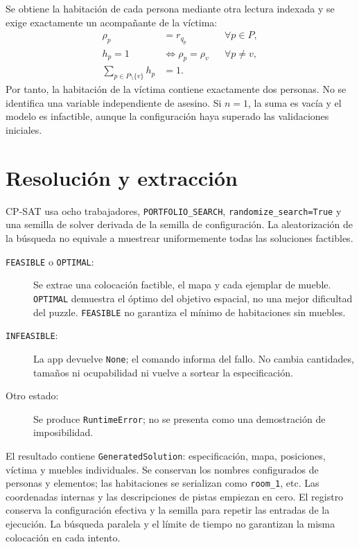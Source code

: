 \documentclass[11pt,a4paper]{article}
\begin{document}
Se obtiene la habitaci\'on de cada persona mediante otra lectura
indexada y se exige exactamente un acompa\~nante de la v\'ictima:
\begin{align}
 \rho_p&=r_{q_p} &&\forall p\in P,\\
 h_p=1&\Longleftrightarrow \rho_p=\rho_v &&\forall p\neq v,\\
 \sum_{p\in P\setminus\{v\}}h_p&=1.
\end{align}
Por tanto, la habitaci\'on de la v\'ictima contiene exactamente dos
personas. No se identifica una variable independiente de asesino.
Si $n=1$, la suma es vac\'ia y el modelo es infactible, aunque la
configuraci\'on haya superado las validaciones iniciales.

\section{Resoluci\'on y extracci\'on}

CP-SAT usa ocho trabajadores, \texttt{PORTFOLIO\_SEARCH},
\texttt{randomize\_search=True} y una semilla de solver derivada de la
semilla de configuraci\'on. La aleatorizaci\'on de la b\'usqueda no
equivale a muestrear uniformemente todas las soluciones factibles.

\begin{description}
  \item[\texttt{FEASIBLE} o \texttt{OPTIMAL}:] Se extrae una colocaci\'on
        factible, el mapa y cada ejemplar de mueble.
        \texttt{OPTIMAL} demuestra el \'optimo del objetivo espacial,
        no una mejor dificultad del puzzle.
        \texttt{FEASIBLE} no garantiza el m\'inimo de habitaciones
        sin muebles.
  \item[\texttt{INFEASIBLE}:] La app devuelve \texttt{None}; el comando
        informa del fallo. No cambia cantidades, tama\~nos ni ocupabilidad
        ni vuelve a sortear la especificaci\'on.
  \item[Otro estado:] Se produce \texttt{RuntimeError}; no se presenta
        como una demostraci\'on de imposibilidad.
\end{description}

El resultado contiene \texttt{GeneratedSolution}: especificaci\'on,
mapa, posiciones, v\'ictima y muebles individuales. Se conservan
los nombres configurados de personas y elementos; las habitaciones
se serializan como \texttt{room\_1}, etc.
Las coordenadas internas y las descripciones de pistas empiezan en cero.
El registro conserva la configuraci\'on efectiva y la semilla para
repetir las entradas de la ejecuci\'on. La b\'usqueda paralela y el
l\'imite de tiempo no garantizan la misma colocaci\'on en cada intento.
\end{document}
